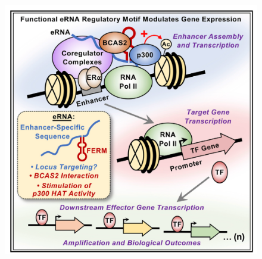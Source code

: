 \begin{figure}
\centering
\includegraphics[width=\textwidth]{../_resources/Screen_Shot_2022-12-20_at_14-17-02.png}
\caption{}
\end{figure}







 


